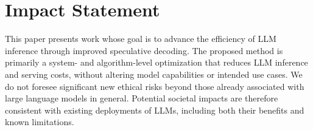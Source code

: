 \section*{Impact Statement}

This paper presents work whose goal is to advance the efficiency of LLM inference through improved speculative decoding. The proposed method is primarily a system- and algorithm-level optimization that reduces LLM inference and serving costs, without altering model capabilities or intended use cases. We do not foresee significant new ethical risks beyond those already associated with large language models in general. Potential societal impacts are therefore consistent with existing deployments of LLMs, including both their benefits and known limitations.

